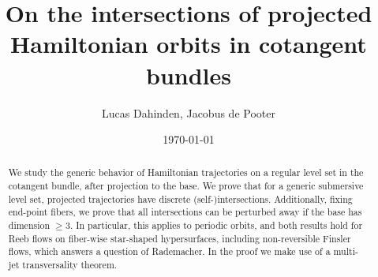 \documentclass{amsart}
\theoremstyle{definition}
\theoremstyle{remark}
\numberwithin{equation}{section}
\begin{document}
\title[]{On the intersections of projected Hamiltonian orbits in cotangent bundles}

\author{Lucas Dahinden, Jacobus de Pooter}



\date{\today}


\begin{abstract}
We study the generic behavior of Hamiltonian trajectories on a regular level set in the cotangent bundle, after projection to the base. We prove that for a generic submersive level set, projected trajectories have discrete (self-)intersections. Additionally, fixing end-point fibers, we prove that all intersections can be perturbed away if the base has dimension $\geq 3$. In particular, this applies to periodic orbits, and both results hold for Reeb flows on fiber-wise star-shaped hypersurfaces, including non-reversible Finsler flows, which answers a question of Rademacher. In the proof we make use of a multi-jet transversality theorem.
\end{abstract}

\maketitle


\tableofcontents
\end{document}
